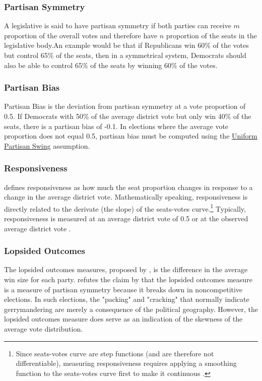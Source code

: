 \subsubsection{Partisan Symmetry}

A legislative is said to have partisan symmetry if both parties can receive $m$ proportion of the overall votes and therefore have $n$ proportion of the seats in the legislative body.An example would be that if Republicans win 60\% of the votes but control 65\% of the seats, then in a symmetrical system, Democrats should also be able to control 65\% of the seats by winning 60\% of the votes. \textcite{katz2020}

\subsubsection{Partisan Bias}
\label{sec:bias}

Partisan Bias is the deviation from partisan symmetry at a vote proportion of 0.5. If Democrats with 50\% of the average district vote but only win 40\% of the seats, there is a partisan bias of -0.1. In elections where the average vote proportion does not equal 0.5, partisan bias must be computed using the \hyperref[sec:ups]{Uniform Partisan Swing} assumption. \parencite{katz2020}

\subsubsection{Responsiveness}

\textcite{katz2020} defines responsiveness as how much the seat proportion changes in response to a change in the average district vote. Mathematically speaking, responsiveness is directly related to the derivate (the slope) of the seats-votes curve.\footnote{Since seats-votes curve are step functions (and are therefore not differentiable), measuring responsiveness requires applying a smoothing function to the seats-votes curve first to make it continuous \parencite{katz2020}.} Typically, responsiveness is measured at an average district vote of 0.5 or at the observed average district vote \parencite{katz2020}.

\subsubsection{Lopsided Outcomes}

The lopsided outcomes measures, proposed by \textcite{wang2016}, is the difference in the average win size for each party.  \textcite{katz2020} refutes the claim by \textcite{wang2016} that the lopsided outcomes measure is a measure of partisan symmetry because it breaks down in noncompetitive elections. In such elections, the "packing" and "cracking" that normally indicate gerrymandering are merely a consequence of the political geography. However, the lopsided outcomes measure does serve as an indication of the skewness of the average vote distribution. 

